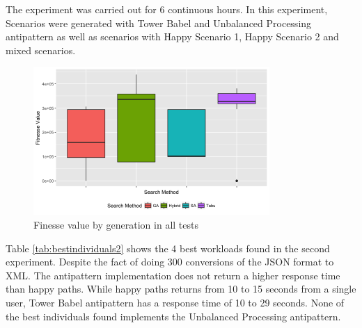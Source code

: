 The experiment was carried out for 6 continuous hours. In this experiment, Scenarios were generated with Tower Babel and Unbalanced Processing antipattern as well as scenarios with Happy Scenario 1, Happy Scenario 2 and mixed scenarios.

\begin{figure}[h]
\begin{minipage}{.5\textwidth}
\centering
\includegraphics[width=0.8\textwidth]{./images/experiment2-2.png}
\caption{Finesse value by generation in all tests}
\label{fig:boxplot2}
\end{minipage}

\end{figure}



Table \ref{tab:bestindividuals2} shows the 4 best workloads found in the second experiment. Despite the fact of doing 300 conversions of the JSON format to XML. The antipattern implementation does not return a higher response time than happy paths. While happy paths returns from 10 to 15 seconds from a single user, Tower Babel antipattern has a response time of 10 to 29 seconds. None of the best individuals found implements the Unbalanced Processing antipattern.


